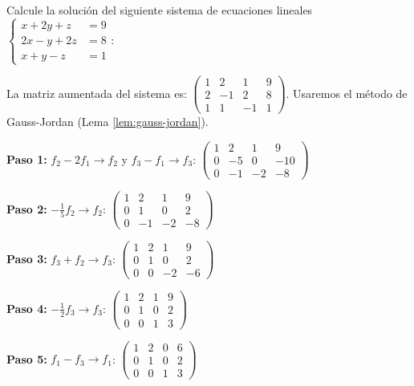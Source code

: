 \begin{example}
Calcule la solución del siguiente sistema de ecuaciones lineales $\begin{cases}
x + 2y + z &= 9 \\
2x - y + 2z &= 8 \\
x + y - z &= 1
\end{cases}:$

\begin{myproof} La matriz aumentada del sistema es:
$\left(\begin{array}{ccc|c}
1 & 2 & 1 & 9 \\
2 & -1 & 2 & 8 \\
1 & 1 & -1 & 1
\end{array}\right).$ Usaremos el método de Gauss-Jordan (Lema \ref{lem:gauss-jordan}).

\textbf{Paso 1:} $f_2 - 2f_1 \rightarrow f_2$ y $f_3 - f_1 \rightarrow f_3$:
$\left(\begin{array}{ccc|c}
1 & 2 & 1 & 9 \\
0 & -5 & 0 & -10 \\
0 & -1 & -2 & -8
\end{array}\right)$

\textbf{Paso 2:} $-\frac{1}{5}f_2 \rightarrow f_2$: $\left(\begin{array}{ccc|c}
1 & 2 & 1 & 9 \\
0 & 1 & 0 & 2 \\
0 & -1 & -2 & -8
\end{array}\right)$

\textbf{Paso 3:} $f_3 + f_2 \rightarrow f_3$: $\left(\begin{array}{ccc|c}
1 & 2 & 1 & 9 \\
0 & 1 & 0 & 2 \\
0 & 0 & -2 & -6
\end{array}\right)$

\textbf{Paso 4:} $-\frac{1}{2}f_3 \rightarrow f_3$: $\left(\begin{array}{ccc|c}
1 & 2 & 1 & 9 \\
0 & 1 & 0 & 2 \\
0 & 0 & 1 & 3
\end{array}\right)$

\textbf{Paso 5:}  $f_1 - f_3 \rightarrow f_1$: $\left(\begin{array}{ccc|c}
1 & 2 & 0 & 6 \\
0 & 1 & 0 & 2 \\
0 & 0 & 1 & 3
\end{array}\right)$


\end{myproof}
\end{example}
